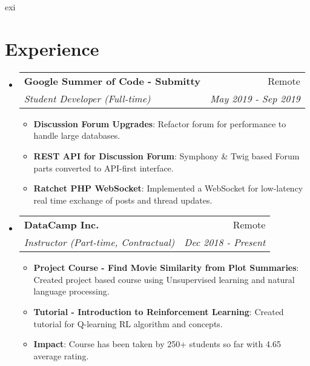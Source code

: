 exi\documentclass[a4paper,20pt]{article}
\makeatletter
\newcommand{\resumeItem}[2]{
  \item\small{
    \textbf{#1}{: #2 \vspace{-2pt}}
  }
}
\newcommand{\resumeSubheading}[4]{
  \vspace{-1pt}\item
    \begin{tabular*}{0.97\textwidth}{l@{\extracolsep{\fill}}r}
      \textbf{#1} & #2 \\
      \textit{#3} & \textit{#4} \\
    \end{tabular*}\vspace{-5pt}
}
\newcommand{\resumeSubHeadingListStart}{\begin{itemize}[leftmargin=*]}
\newcommand{\resumeSubHeadingListEnd}{\end{itemize}}
\newcommand{\resumeItemListStart}{\begin{itemize}}
\newcommand{\resumeItemListEnd}{\end{itemize}\vspace{-5pt}}
\makeatother
\begin{document}
\section{Experience}
  \resumeSubHeadingListStart
    \resumeSubheading{Google Summer of Code - Submitty}{Remote}
    {Student Developer (Full-time)}{May 2019 - Sep 2019}
    \resumeItemListStart
        \resumeItem{Discussion Forum Upgrades}
          {Refactor forum for performance to handle large databases.}
          \resumeItem{REST API for Discussion Forum}
          {Symphony \& Twig based Forum parts converted to API-first interface.}
          \resumeItem{Ratchet PHP WebSocket}{Implemented a WebSocket for low-latency real time exchange of posts and thread updates.}
      \resumeItemListEnd
\vspace{-5pt}
    \resumeSubheading
		{DataCamp Inc.}{Remote}
		{Instructor (Part-time, Contractual)}{Dec 2018 -  Present}
		\resumeItemListStart
        \resumeItem{Project Course - Find Movie Similarity from Plot Summaries}
          {Created project based course using Unsupervised learning and natural language processing.}
        \resumeItem{Tutorial - Introduction to Reinforcement Learning}
          {Created tutorial for Q-learning RL algorithm and  concepts.}
        \resumeItem{Impact}{Course has been taken by 250+ students so far with 4.65 average rating.}
		\resumeItemListEnd

\resumeSubHeadingListEnd

\vspace{-5pt}
\end{document}
